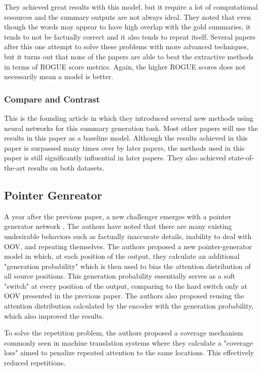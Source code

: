 \documentclass[11pt,a4paper]{article}
\begin{document}
They achieved great results with this model, but it require a lot of computational resources and the summary outputs are not always ideal. They noted that even though the words may appear to have high overlap with the gold summaries, it tends to not be factually correct and it also tends to repeat itself. Several papers after this one attempt to solve these problems with more advanced techniques, but it turns out that none of the papers are able to beat the extractive methods in terms of ROGUE score metrics. Again, the higher ROGUE scores does not necessarily mean a model is better. 

\subsubsection{Compare and Contrast}

This is the founding article in which they introduced several new methods using neural networks for this summary generation task. Most other papers will use the results in this paper as a baseline model. Although the results achieved in this paper is surpassed many times over by later papers, the methods used in this paper is still significantly influential in later papers. They also achieved state-of-the-art results on both datasets.

\subsection{Pointer Genreator} 
A year after the previous paper, a new challenger emerges with a pointer generator network \cite{pointer-generator}. The authors have noted that there are many existing undesirable behaviors such as factually inaccurate details, inability to deal with OOV, and repeating themselves. The authors proposed a new pointer-generator model in which, at each position of the output, they calculate an additional "generation probability" which is then used to bias the attention distribution of all source positions. This generation probability essentially serves as a soft "switch" at every position of the output, comparing to the hard switch only at OOV presented in the previous paper. The authors also proposed reusing the attention distribution calculated by the encoder with the generation probability, which also improved the results. 

To solve the repetition problem, the authors proposed a coverage mechanism commonly seen in machine translation systems where they calculate a "coverage loss" aimed to penalize repeated attention to the same locations. This effectively reduced repetitions.
\end{document}
